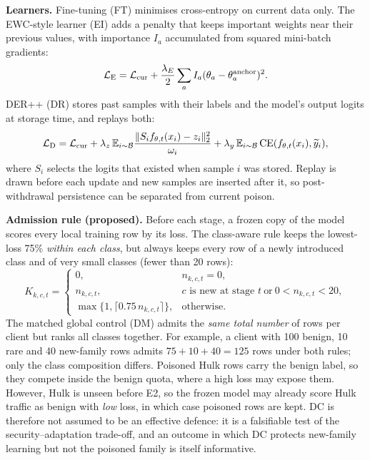 \documentclass[10pt,a4paper]{article}
\newcommand{\CE}{\operatorname{CE}}
\begin{document}
\textbf{Learners.} Fine-tuning (FT) minimises cross-entropy on current data only. The EWC-style learner (EI) adds a penalty that keeps important weights near their previous values, with importance $I_a$ accumulated from squared mini-batch gradients:
\begin{equation}
\mathcal L_{\rm E}=\mathcal L_{\rm cur}+\frac{\lambda_E}{2}\sum_aI_a(\theta_a-\theta_a^{\rm anchor})^2 .
\label{eq:ewc}
\end{equation}
DER++ (DR) stores past samples with their labels and the model's output logits at storage time, and replays both:
\begin{equation}
\mathcal L_{\rm D}=\mathcal L_{\rm cur}
+\lambda_z\,\mathbb E_{i\sim\mathcal B}\frac{\|S_if_{\theta,t}(x_i)-z_i\|_2^2}{\omega_i}
+\lambda_y\,\mathbb E_{i\sim\mathcal B}\CE(f_{\theta,t}(x_i),\widetilde y_i),
\label{eq:der}
\end{equation}
where $S_i$ selects the logits that existed when sample $i$ was stored. Replay is drawn before each update and new samples are inserted after it, so post-withdrawal persistence can be separated from current poison.

\textbf{Admission rule (proposed).} Before each stage, a frozen copy of the model scores every local training row by its loss. The class-aware rule keeps the lowest-loss 75\% \emph{within each class}, but always keeps every row of a newly introduced class and of very small classes (fewer than 20 rows):
\begin{equation}
K_{k,c,t}=\begin{cases}
0,&n_{k,c,t}=0,\\
n_{k,c,t},&c\text{ is new at stage }t\ \text{or}\ 0<n_{k,c,t}<20,\\
\max\{1,\lceil 0.75\,n_{k,c,t}\rceil\},&\text{otherwise.}
\end{cases}
\label{eq:quota}
\end{equation}
The matched global control (DM) admits the \emph{same total number} of rows per client but ranks all classes together. For example, a client with 100 benign, 10 rare and 40 new-family rows admits $75+10+40=125$ rows under both rules; only the class composition differs. Poisoned Hulk rows carry the benign label, so they compete inside the benign quota, where a high loss may expose them. However, Hulk is unseen before E2, so the frozen model may already score Hulk traffic as benign with \emph{low} loss, in which case poisoned rows are kept. DC is therefore not assumed to be an effective defence: it is a falsifiable test of the security--adaptation trade-off, and an outcome in which DC protects new-family learning but not the poisoned family is itself informative.
\end{document}
